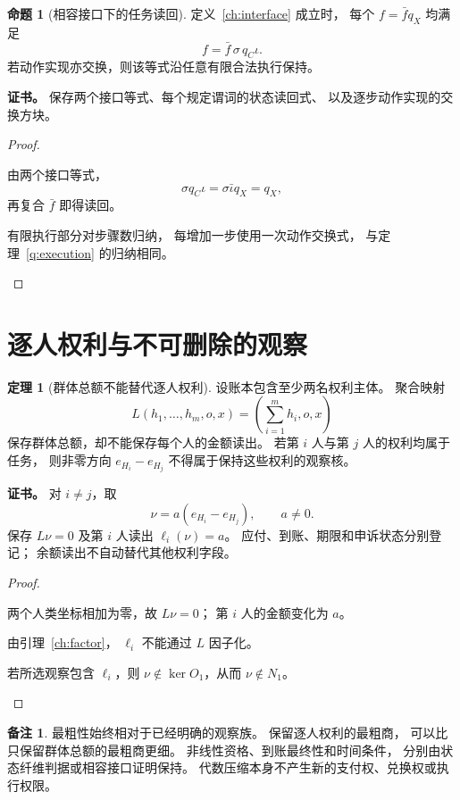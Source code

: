 \documentclass[UTF8,12pt,a4paper,openany,fontset=none,zihao=false]{ctexrep}
\theoremstyle{definition}
\newtheorem{theorem}{定理}[chapter]
\newtheorem{proposition}{命题}[chapter]
\newtheorem{remark}{备注}[chapter]
\newenvironment{certificate}{\par\noindent\textbf{证书。}\ignorespaces}{\par}
\newcommand{\1}{\mathbf 1}
\begin{document}
\begin{proposition}[相容接口下的任务读回]
\label{ch:readback}
定义~\ref{ch:interface} 成立时，
每个 \(f=\bar f q_X\) 均满足
\[
f=\bar f\,\sigma\,q_C\iota.
\]
若动作实现亦交换，则该等式沿任意有限合法执行保持。
\end{proposition}
\begin{certificate}
保存两个接口等式、每个规定谓词的状态读回式、
以及逐步动作实现的交换方块。
\end{certificate}
\begin{proof}
\begin{semanticsteps}
\item 由两个接口等式，
\[
\sigma q_C\iota=\sigma\bar\iota q_X=q_X,
\]
再复合 \(\bar f\) 即得读回。
\item 有限执行部分对步骤数归纳，
每增加一步使用一次动作交换式，
与定理~\ref{q:execution} 的归纳相同。
\end{semanticsteps}
\end{proof}
\section{逐人权利与不可删除的观察}
\begin{theorem}[群体总额不能替代逐人权利]
\label{ch:individual}
设账本包含至少两名权利主体。
聚合映射
\[
L(h_1,\ldots,h_m,o,x)
=\left(\sum_{i=1}^m h_i,o,x\right)
\]
保存群体总额，却不能保存每个人的金额读出。
若第 \(i\) 人与第 \(j\) 人的权利均属于任务，
则非零方向 \(e_{H_i}-e_{H_j}\)
不得属于保持这些权利的观察核。
\end{theorem}
\begin{certificate}
对 \(i\ne j\)，取
\[
\nu=a(e_{H_i}-e_{H_j}),\qquad a\ne0.
\]
保存 \(L\nu=0\) 及第 \(i\) 人读出
\(\ell_i(\nu)=a\)。
应付、到账、期限和申诉状态分别登记；
余额读出不自动替代其他权利字段。
\end{certificate}
\begin{proof}
\begin{semanticsteps}
\item 两个人类坐标相加为零，故 \(L\nu=0\)；
第 \(i\) 人的金额变化为 \(a\)。
\item 由引理~\ref{ch:factor}，
\(\ell_i\) 不能通过 \(L\) 因子化。
\item 若所选观察包含 \(\ell_i\)，则
\(\nu\notin\ker O_1\)，从而 \(\nu\notin N_1\)。
\end{semanticsteps}
\end{proof}
\begin{remark}
最粗性始终相对于已经明确的观察族。
保留逐人权利的最粗商，
可以比只保留群体总额的最粗商更细。
非线性资格、到账最终性和时间条件，
分别由状态纤维判据或相容接口证明保持。
代数压缩本身不产生新的支付权、兑换权或执行权限。
\end{remark}
\end{document}
